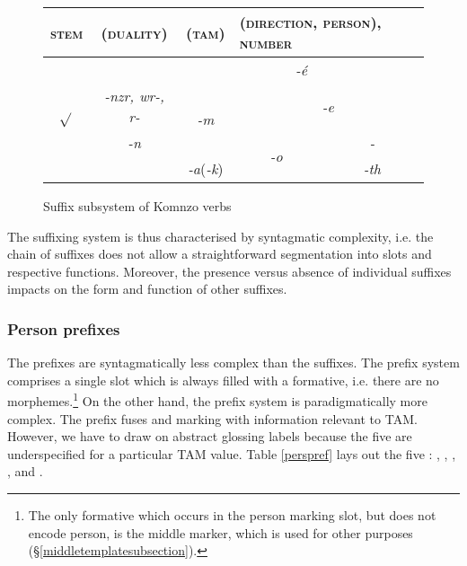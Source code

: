\begin{figure}
\begin{center}%
	\begin{tabular}{|c|c|c|c|c|}
		\hline
		\textsc{stem}&\textsc{(duality)}&\multicolumn{1}{l|}{\textsc{(tam)}}&\multicolumn{2}{l|}{\textsc{(direction, person), number}}\\ \hline
		\multirow{4}{*}{$\sqrt{}$}&&\multicolumn{3}{c|}{\emph{-é}}\\ \cline{3-5}
		&\emph{-nzr, wr-, r-} & \multirow{2}{*}{\emph{-m}}&  \multicolumn{2}{c|}{\emph{-e}}\\\cline{4-5}
		&\emph{-n} &&\multirow{2}{*}{\emph{-o}} & \emph{-\Zero}\\\cline{3-3}\cline{5-5}
		&&\multicolumn{1}{c|}{\emph{-a}(\emph{-k})} & & \emph{-th}\\
		\hline
	\end{tabular}
\end{center}
\caption{Suffix subsystem of Komnzo verbs}\label{suffsubsys}
\end{figure}%

The suffixing system is thus characterised by syntagmatic complexity, i.e. the chain of suffixes does not allow a straightforward segmentation into slots and respective functions. Moreover, the presence versus absence of individual suffixes impacts on the form and function of other suffixes.

\subsubsection{Person prefixes} \label{personprefsection}

The  prefixes are syntagmatically less complex than the  suffixes. The prefix system comprises a single slot which is always filled with a formative, i.e. there are no  morphemes.\footnote{The only formative which occurs in the person marking slot, but does not encode person, is the middle marker, which is used for other purposes (\S{}\ref{middletemplatesubsection}).} On the other hand, the prefix system is paradigmatically more complex. The prefix fuses  and  marking with information relevant to TAM. However, we have to draw on abstract glossing labels because the five  are underspecified for a particular TAM value. Table \ref{perspref} lays out the five : \Alph, \Bet, \Betaone, \Betatwo, and \Gam.

